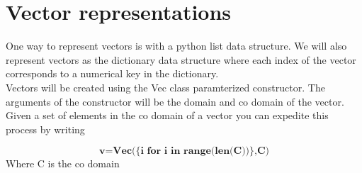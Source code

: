 \documentclass[12pt,a4paper]{article}
\begin{document}
\section{Vector representations}
One way to represent vectors is with a python list data structure. We will also represent vectors as the dictionary data structure where each index of the vector corresponds to a numerical key in the dictionary.  \\
Vectors will be created using the Vec class paramterized constructor. The arguments of the constructor will be the domain and co domain of the vector. Given a set of elements in the co domain of a vector you can expedite this process by writing

\[
  \textbf{v=Vec(\{i for i in range(len(C))\},C)}
\]
Where C is the co domain\\
\end{document}
